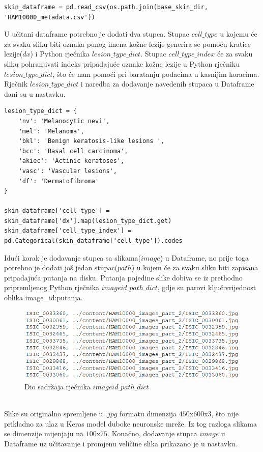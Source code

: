 \documentclass[times, utf8, zavrsni]{fer}
\begin{document}
\begin{verbatim}
skin_dataframe = pd.read_csv(os.path.join(base_skin_dir, 'HAM10000_metadata.csv'))
\end{verbatim}

U učitani dataframe potrebno je dodati dva stupca. Stupac $cell\_type$ u kojemu će za svaku sliku biti oznaka punog imena kožne lezije generira se pomoću kratice lezije($dx$) i Python rječnika  $lesion\_type\_dict$.   Stupac $cell\_type\_index$ će za svaku sliku pohranjivati indeks pripadajuće oznake kožne lezije u Python rječniku $lesion\_type\_dict$, što će nam pomoći pri baratanju podacima u kasnijim koracima. Rječnik $lesion\_type\_dict$ i naredba za dodavanje navedenih stupaca u Dataframe dani su u nastavku.

\begin{verbatim}
lesion_type_dict = {
    'nv': 'Melanocytic nevi',
    'mel': 'Melanoma',
    'bkl': 'Benign keratosis-like lesions ',
    'bcc': 'Basal cell carcinoma',
    'akiec': 'Actinic keratoses',
    'vasc': 'Vascular lesions',
    'df': 'Dermatofibroma'
}

skin_dataframe['cell_type'] = skin_dataframe['dx'].map(lesion_type_dict.get) 
skin_dataframe['cell_type_index'] = pd.Categorical(skin_dataframe['cell_type']).codes
\end{verbatim}

Idući korak je dodavanje stupca sa slikama($image$) u Dataframe, no prije toga potrebno je dodati još jedan stupac($path$) u kojem će za svaku sliku biti zapisana pripadajuća putanja na disku. Putanja pojedine slike dobiva se iz prethodno pripremljenog Python rječnika $imageid\_path\_dict$, gdje su parovi ključ:vrijednost oblika image\_id:putanja.\\
%
\begin{figure}[!h]
\hspace{-0.05\textwidth}
\includegraphics[width=1.1\textwidth]{./slike/dict}
\caption{Dio sadržaja rječnika $imageid\_path\_dict$}
\label{fig:dict}
\end{figure}
%
\\ 
Slike su originalno spremljene u $.jpg$ formatu dimenzija $450$x$600$x$3$, što nije prikladno za ulaz u Keras model duboke neuronske mreže. Iz tog razloga slikama se dimenzije mijenjaju na $100$x$75$. Konačno, dodavanje stupca $image$ u Dataframe uz učitavanje i promjenu veličine slika prikazano je u nastavku.
\end{document}
